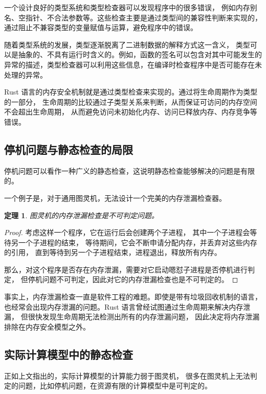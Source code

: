\documentclass[twocolumn]{ctexart}
\newtheorem{theorem}{定理}
\begin{document}
一个设计良好的类型系统和类型检查器可以发现程序中的很多错误，
例如内存别名、空指针、不合法参数等。这些检查主要是通过类型间的兼容性判断来实现的，
通过阻止不兼容类型的变量赋值与运算，避免程序中的错误。

随着类型系统的发展，类型逐渐脱离了二进制数据的解释方式这一含义，
类型可以是抽象的、不具有运行时含义的。例如，函数的签名可以包含对其中可能发生的异常的描述，类型检查器可以利用这些信息，在编译时检查程序中是否可能存在未处理的异常\cite{cpp,checkerr}。

Rust 语言的内存安全机制就是通过类型检查来实现的。通过将生命周期作为类型的一部分，
生命周期的比较通过子类型关系来判断，从而保证可访问的内存空间不会超出生命周期，
从而避免访问未初始化内存、访问已释放内存、内存竞争等错误\cite{rust}。

\subsection{停机问题与静态检查的局限}

停机问题可以看作一种广义的静态检查，这说明静态检查能够解决的问题是有限的。

一个例子是，对于通用图灵机，无法设计一个完美的内存泄漏检查器。

\begin{theorem}\label{thm:memoryleak}
    图灵机的内存泄漏检查是不可判定问题。
\end{theorem}

\begin{proof}
    考虑这样一个程序，它在运行后会创建两个子进程，
    其中一个子进程会等待另一个子进程的结束，
    等待期间，它会不断申请分配内存，并丢弃对这些内存的引用，
    直到等待到另一个子进程结束，进程退出，释放所有内存。

    那么，对这个程序是否存在内存泄漏，需要对它启动嗯怼子进程是否停机进行判定，
    但停机问题不可判定，因此对它的内存泄漏检查也是不可判定的。
\end{proof}

事实上，内存泄漏检查一直是软件工程的难题。即使是带有垃圾回收机制的语言，
也经常会出现内存泄漏的问题。Rust 语言曾经试图通过生命周期来解决内存泄漏，
但很快发现生命周期无法检测出所有的内存泄漏问题，
因此决定将内存泄漏排除在内存安全模型之外\cite{rustbug}。

\subsection{实际计算模型中的静态检查}

正如上文指出的，实际计算模型的计算能力弱于图灵机，
很多在图灵机上无法判定的问题，比如停机问题，在资源有限的计算模型中是可判定的。
\end{document}
